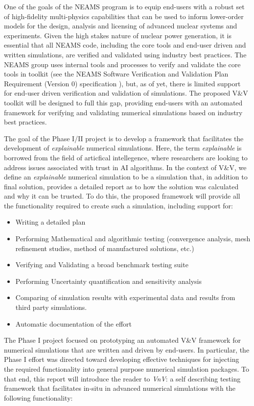 One of the goals of the NEAMS program is to equip end-users with a robust set of high-fidelity multi-physics capabilities that can be used to inform lower-order models for the design, analysis and licensing of advanced nuclear systems and experiments. Given the high stakes nature of nuclear power generation, it is essential that all NEAMS code, including the core tools and end-user driven and written simulations, are verified and validated using industry best practices. The NEAMS group uses internal tools and processes to verify and validate the core tools in toolkit (see the NEAMS Software Verification and Validation Plan Requirement (Version 0) specification \cite{NEAMSVV}), but, as of yet, there is limited support for end-user driven verification and validation of simulations. The proposed V\&V toolkit will be designed to full this gap, providing end-users with an automated framework for verifying and validating numerical simulations based on industry best practices.

The goal of the Phase I/II project is to develop a framework that facilitates the development of \emph{explainable} numerical simulations. Here, the term \emph{explainable} is borrowed from the field of articfical intellegence, where researchers are looking to address issues associated with trust in AI algorithms. In the context of V\&V, we define an \emph{explainable} numerical simulation to be a simulation that, in addition to final solution, provides a detailed report as to how the solution was calculated and why it can be trusted. To do this, the proposed framework will provide all the functionality required to create such a simulation, including support for:

\begin{itemize}
 \item Writing a detailed \VV plan
 \item Performing Mathematical and algorithmic testing (convergence analysis, mesh refinement studies, method of manufactured solutions, etc.)
 \item Verifying and Validating a broad benchmark testing suite
 \item Performing Uncertainty quantification and sensitivity analysis
 \item Comparing of simulation results with experimental data and results from third party simulations. 
 \item Automatic documentation of the \VV effort
\end{itemize}

The Phase I project focused on prototyping an automated V\&V framework for numerical simulations that are written and driven by end-users. In particular, the Phase I effort was directed toward developing effective techniques for injecting the required functionality into general purpose numerical simulation packages. To that end, this report will introduce the reader to \emph{VnV}: a self describing testing framework that facilitates in-situ \VV in advanced numerical simulations with the following functionality:

